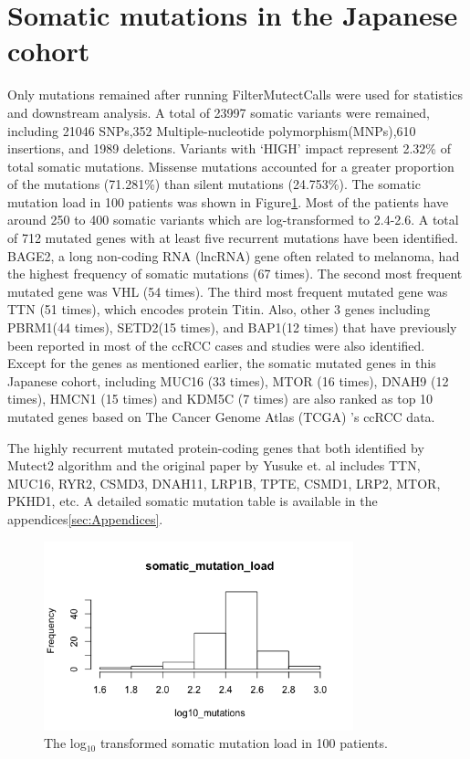 \section{Somatic mutations in the Japanese cohort}

Only mutations remained after running FilterMutectCalls were used for statistics and downstream analysis. A total of 23997 somatic variants were remained, including 21046 SNPs,352 Multiple-nucleotide polymorphism(MNPs),610 insertions, and 1989 deletions. Variants with ‘HIGH’ impact represent 2.32\% of total somatic mutations. Missense mutations accounted for a greater proportion of the mutations (71.281\%) than silent mutations (24.753\%). The somatic mutation load in 100 patients was shown in Figure\ref{Somatic_load}. Most of the patients have around 250 to 400 somatic variants which are log-transformed to 2.4-2.6. A total of 712 mutated genes with at least five recurrent mutations have been identified. BAGE2, a long non-coding RNA (lncRNA) gene often related to melanoma, had the highest frequency of somatic mutations (67 times). The second most frequent mutated gene was VHL (54 times). The third most frequent mutated gene was TTN (51 times), which encodes protein Titin. Also, other 3 genes including PBRM1(44 times), SETD2(15 times), and BAP1(12 times) that have previously been reported in most of the ccRCC cases and studies were also identified. Except for the genes as mentioned earlier, the somatic mutated genes in this Japanese cohort, including MUC16 (33 times), MTOR (16 times), DNAH9 (12 times), HMCN1 (15 times) and KDM5C (7 times) are also ranked as top 10 mutated genes based on The Cancer Genome Atlas (TCGA) ’s ccRCC data.

The highly recurrent mutated protein-coding genes that both identified by Mutect2 algorithm and the original paper by Yusuke et. al\cite{sato_integrated_2013} includes TTN, MUC16, RYR2, CSMD3, DNAH11, LRP1B, TPTE, CSMD1, LRP2, MTOR, PKHD1, etc. A detailed somatic mutation table is available in the appendices\ref{sec:Appendices}.


\begin{figure}[h]
\centering
\includegraphics[width=0.8\textwidth]{figures/somatic_mutation_load.png}
\caption{The log$_{10}$ transformed somatic mutation load in 100 patients.}
\label{Somatic_load}
\end{figure}

